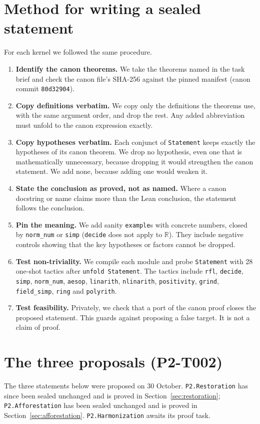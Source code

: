 \documentclass[11pt]{article}
\theoremstyle{definition}
\theoremstyle{remark}
\begin{document}
\section{Method for writing a sealed statement}
For each kernel we followed the same procedure.
\begin{enumerate}
\item \textbf{Identify the canon theorems.} We take the theorems named in the task brief and check the canon file's SHA-256
against the pinned manifest (canon commit \texttt{80d32904}).
\item \textbf{Copy definitions verbatim.} We copy only the definitions the theorems use, with the same argument order,
and drop the rest. Any added abbreviation must unfold to the canon expression exactly.
\item \textbf{Copy hypotheses verbatim.} Each conjunct of \texttt{Statement} keeps exactly the hypotheses of its canon theorem.
We drop no hypothesis, even one that is mathematically unnecessary, because dropping it would strengthen the canon statement.
We add none, because adding one would weaken it.
\item \textbf{State the conclusion as proved, not as named.} Where a canon docstring or name claims more than the Lean
conclusion, the statement follows the conclusion.
\item \textbf{Pin the meaning.} We add sanity \texttt{example}s with concrete numbers, closed by \texttt{norm\_num} or \texttt{simp}
(\texttt{decide} does not apply to $\mathbb{R}$). They include negative controls showing that the key hypotheses or factors cannot be dropped.
\item \textbf{Test non-triviality.} We compile each module and probe \texttt{Statement} with 28 one-shot tactics
after \texttt{unfold Statement}. The tactics include \texttt{rfl}, \texttt{decide}, \texttt{simp}, \texttt{norm\_num}, \texttt{aesop},
\texttt{linarith}, \texttt{nlinarith}, \texttt{positivity}, \texttt{grind}, \texttt{field\_simp}, \texttt{ring} and \texttt{polyrith}.
\item \textbf{Test feasibility.} Privately, we check that a port of the canon proof closes the proposed statement.
This guards against proposing a false target. It is not a claim of proof.
\end{enumerate}

\section{The three proposals (P2-T002)}\label{sec:proposals}
The three statements below were proposed on 30 October. \texttt{P2.Restoration} has since been sealed unchanged and is proved in
Section~\ref{sec:restoration}; \texttt{P2.Afforestation} has been sealed unchanged and is proved in
Section~\ref{sec:afforestation}. \texttt{P2.Harmonization} awaits its proof task.
\end{document}
